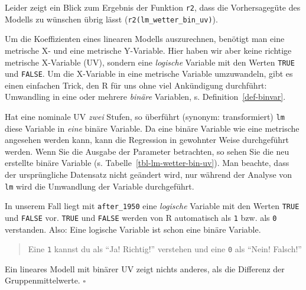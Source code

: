 \documentclass[
  letterpaper,
  twoside,
  open=any]{scrbook}
\theoremstyle{definition}
\theoremstyle{definition}
\theoremstyle{definition}
\theoremstyle{remark}
\begin{document}
Leider zeigt ein Blick zum Ergebnis der Funktion \texttt{r2}, dass die
Vorhersagegüte des Modells zu wünschen übrig lässt
(\texttt{r2(lm\_wetter\_bin\_uv)}).

Um die Koeffizienten eines linearen Modells auszurechnen, benötigt man
eine metrische X- und eine metrische Y-Variable. Hier haben wir aber
keine richtige metrische X-Variable (UV), sondern eine \emph{logische}
Variable mit den Werten \texttt{TRUE} und \texttt{FALSE}. Um die
X-Variable in eine metrische Variable umzuwandeln, gibt es einen
einfachen Trick, den R für uns ohne viel Ankündigung durchführt:
Umwandling in eine oder mehrere \emph{binäre} Variablen, s.
Definition~\ref{def-binvar}.

Hat eine nominale UV \emph{zwei} Stufen, so überführt (synonym:
transformiert) \texttt{lm} diese Variable in \emph{eine} binäre
Variable. Da eine binäre Variable wie eine metrische angesehen werden
kann, kann die Regression in gewohnter Weise durchgeführt werden. Wenn
Sie die Ausgabe der Parameter betrachten, so sehen Sie die neu erstellte
binäre Variable (s. Tabelle~\ref{tbl-lm-wetter-bin-uv}). Man beachte,
dass der ursprüngliche Datensatz nicht geändert wird, nur während der
Analyse von \texttt{lm} wird die Umwandlung der Variable durchgeführt.

In unserem Fall liegt mit \texttt{after\_1950} eine \emph{logische}
Variable mit den Werten \texttt{TRUE} und \texttt{FALSE} vor.
\texttt{TRUE} und \texttt{FALSE} werden von R automatisch als \texttt{1}
bzw. als \texttt{0} verstanden. Also: Eine logische Variable ist schon
eine binäre Variable.

\begin{quote}
{} Eine \texttt{1} kannst du als \enquote{Ja! Richtig!}
verstehen und eine \texttt{0} als \enquote{Nein! Falsch!}
\end{quote}

\begin{tcolorbox}[enhanced jigsaw, colframe=quarto-callout-important-color-frame, arc=.35mm, leftrule=.75mm, bottomtitle=1mm, titlerule=0mm, colbacktitle=quarto-callout-important-color!10!white, breakable, bottomrule=.15mm, colback=white, left=2mm, rightrule=.15mm, opacityback=0, toptitle=1mm, toprule=.15mm, opacitybacktitle=0.6, title=\textcolor{quarto-callout-important-color}{\faExclamation}\hspace{0.5em}{Wichtig}, coltitle=black]

Ein lineares Modell mit binärer UV zeigt nichts anderes, als die
Differenz der Gruppenmittelwerte. \(\square\)

\end{tcolorbox}
\end{document}

